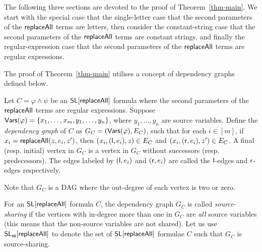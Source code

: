 The following three sections are devoted to the proof of Theorem~\ref{thm-main}. We start with the special case that the single-letter case that the second parameters of the $\mathsf{replaceAll}$ terms are letters, then consider the constant-string case that the second parameters of the $\mathsf{replaceAll}$ terms are constant strings, and finally the regular-expression case that the second parameters of the $\mathsf{replaceAll}$ terms are regular expressions.

The proof of Theorem~\ref{thm-main} utilises a concept of dependency graphs defined below.

\begin{definition}
	Let $C= \varphi \wedge \psi$ be an $\mathsf{SL}[\mathsf{replaceAll}]$ formula where the second parameters of the $\mathsf{replaceAll}$ terms are regular expressions. Suppose $\mathsf{Vars}(\varphi) = \{x_1,\dots, x_m, y_1, \dots, y_n\}$, where $y_1,\dots, y_n$ are  source variables. Define the \emph{dependency graph} of $C$ as $G_C= (\mathsf{Vars}(\varphi), E_C)$, such that for each $i \in [m]$, if $x_i = \mathsf{replaceAll}(z, e_i, z')$, then $(x_i, (\mathsf{l}, e_i), z) \in E_C$ and $(x_i, (\mathsf{r}, e_i), z') \in E_C$. A final (resp. initial) vertex in $G_C$ is a vertex in $G_C$ without successors (resp. predecessors). The edges labeled by $(\mathsf{l}, e_i)$ and $(\mathsf{r}, e_i)$ are called the $\mathsf{l}$-edges and $\mathsf{r}$-edges respectively. 
\end{definition}
Note that $G_C$ is a DAG where the out-degree of each vertex is two or zero. 


For an $\mathsf{SL}[\mathsf{replaceAll}]$ formula $C$, the dependency graph $G_C$ is called \emph{source-sharing} if the vertices with in-degree more than one in $G_C$ are \emph{all} source variables (this means that the non-source variables are not shared). Let us use $\mathsf{SL}_{\sf ss}[\mathsf{replaceAll}]$ to denote the set of $\mathsf{SL}[\mathsf{replaceAll}]$ formulae $C$  such that $G_C$ is source-sharing.

